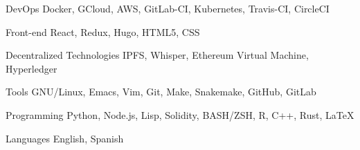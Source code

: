 

\begin{cvskills}

  \cvskill
    {DevOps} %
    {Docker, GCloud, AWS, GitLab-CI, Kubernetes, Travis-CI, CircleCI} %

  \cvskill
    {Front-end} %
    {React, Redux, Hugo, HTML5, CSS} %

  \cvskill
    {Decentralized Technologies} %
    {IPFS, Whisper, Ethereum Virtual Machine, Hyperledger} %

  \cvskill
    {Tools} %
    {GNU/Linux, Emacs, Vim, Git, Make, Snakemake,  GitHub, GitLab} %

  \cvskill
    {Programming} %
    {Python, Node.js, Lisp, Solidity, BASH/ZSH, R, C++, Rust, LaTeX} %

  \cvskill
    {Languages} %
    {English, Spanish} %

\end{cvskills}
